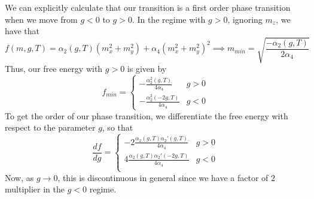 We can explicitly calculate that our transition is a first order phase transition when we move from $g< 0$ to $g > 0$. In the regime with $g > 0$, ignoring $m_z$, we have that 
\[ 
	f(m, g, T) = \alpha_2( g, T) (m_x^2 + m_y^2) + \alpha_4 ( m_x^2 + m_y^2)^2 \implies m_{min} = \sqrt{ \frac{  - \alpha_2 ( g, T ) }{ 2 \alpha_4 } } 
\] Thus, our free energy with $g > 0 $ is given by 
\[ 
	f_{min} = \begin{cases}  - \frac{ \alpha_2^2 ( g, T ) }{ 4 \alpha_4 }  & g > 0 \\
	         - \frac{ \alpha_2^2 (  - 2 g, T ) }{ 4 \alpha_4 } & g < 0 
	         \end{cases}
\] To get the order of our phase transition, we differentiate the free energy with respect to the parameter $g$, so that 
\[ 
	\frac{ df}{ dg} = \begin{cases} 
		 - 2 \frac{ \alpha_2 (g, T ) \alpha_2' ( g, T ) }{ 4 \alpha_4 } & g > 0 \\
		  4 \frac{ \alpha_2 (g, T ) \alpha_2' ( -2g, T ) }{ 4 \alpha_4 } & g < 0 \\
\end{cases} 
\] 
Now, as $g \rightarrow 0$, this is discontinuous in general since we have a factor of $2$ multiplier in the $g < 0$ regime. 

\pagebreak 

